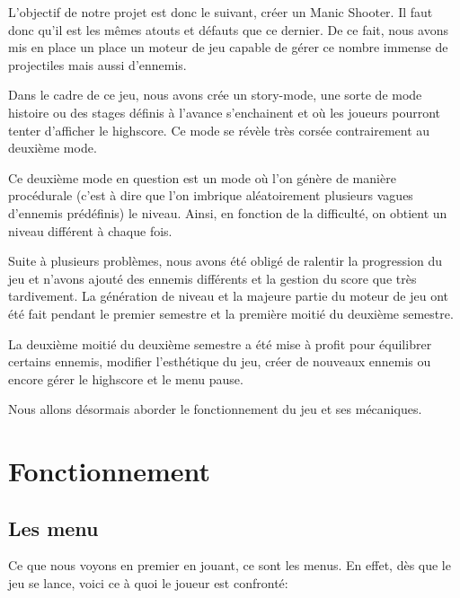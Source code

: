 \documentclass{article}
\begin{document}
L'objectif de notre projet est donc le suivant, créer un Manic Shooter. Il faut
donc qu'il est les mêmes atouts et défauts que ce dernier. De ce fait, nous
avons mis en place un place un moteur de jeu capable de gérer ce nombre immense
de projectiles mais aussi d'ennemis. \newline

Dans le cadre de ce jeu, nous avons crée un story-mode, une sorte de mode
histoire ou des stages définis à l'avance s'enchainent et où les joueurs
pourront tenter d'afficher le highscore. Ce mode se révèle très corsée
contrairement au deuxième mode. \newline

Ce deuxième mode en question est un mode où l'on génère de manière procédurale
(c'est à dire que l'on imbrique aléatoirement plusieurs vagues d'ennemis
prédéfinis) le niveau. Ainsi, en fonction de la difficulté, on obtient un niveau
différent à chaque fois. \newline

Suite à plusieurs problèmes, nous avons été obligé de ralentir la progression du
jeu et n'avons ajouté des ennemis différents et la gestion du score que très
tardivement. La génération de niveau et la majeure partie du moteur de jeu ont
été fait pendant le premier semestre et la première moitié du deuxième semestre.
\newline

La deuxième moitié du deuxième semestre a été mise à profit pour équilibrer
certains ennemis, modifier l'esthétique du jeu, créer de nouveaux ennemis ou
encore gérer le highscore et le menu pause. \newline

Nous allons désormais aborder le fonctionnement du jeu et ses mécaniques.
\newpage

\section{Fonctionnement}

\subsection{Les menu}

Ce que nous voyons en premier en jouant, ce sont les menus. En effet, dès que le
jeu se lance, voici ce à quoi le joueur est confronté:
\end{document}
